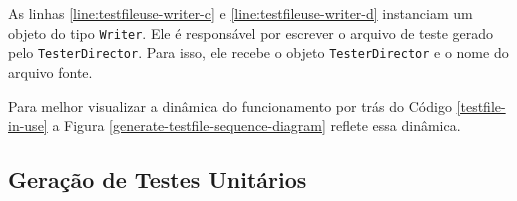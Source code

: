 As linhas \ref{line:testfileuse-writer-c} e \ref{line:testfileuse-writer-d}
instanciam um objeto do tipo \lstinline|Writer|. Ele é responsável por escrever
o arquivo de teste gerado pelo \lstinline|TesterDirector|. Para isso, ele
recebe o objeto \lstinline|TesterDirector| e o nome do arquivo fonte.

Para melhor visualizar a dinâmica do funcionamento por trás do Código
\ref{testfile-in-use} a Figura \ref{generate-testfile-sequence-diagram}
reflete essa dinâmica.

\subsection{Geração de Testes Unitários}


